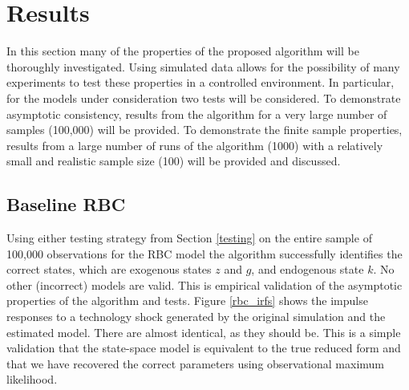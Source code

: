 \documentclass{article}
\begin{document}
\section{Results} \label{results}

In this section many of the properties of the proposed algorithm will be thoroughly investigated. Using simulated data allows for the possibility of many experiments to test these properties in a controlled environment. In particular, for the models under consideration two tests will be considered. To demonstrate asymptotic consistency, results from the algorithm for a very large number of samples (100,000) will be provided. To demonstrate the finite sample properties, results from a large number of runs of the algorithm (1000) with a relatively small and realistic sample size (100) will be provided and discussed.

\subsection{Baseline RBC}

Using either testing strategy from Section \ref{testing} on the entire sample of 100,000 observations for the RBC model the algorithm successfully identifies the correct states, which are exogenous states $z$ and $g$, and endogenous state $k$. No other (incorrect) models are valid. This is empirical validation of the asymptotic properties of the algorithm and tests. Figure \ref{rbc_irfs} shows the impulse responses to a technology shock generated by the original simulation and the estimated model. There are almost identical, as they should be. This is a simple validation that the state-space model is equivalent to the true reduced form and that we have recovered the correct parameters using observational maximum likelihood.
\end{document}

